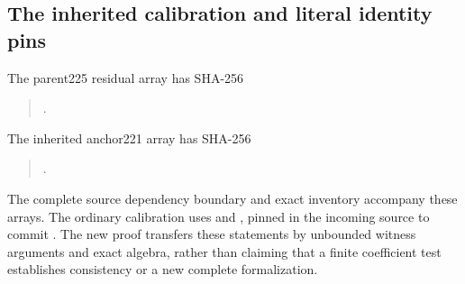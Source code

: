 \subsection{The inherited calibration and literal identity pins}
The parent225 residual array has SHA-256
\begin{quote}\small
{}.
\end{quote}
The inherited anchor221 array has SHA-256
\begin{quote}\small
{}.
\end{quote}
The complete source dependency boundary and exact inventory accompany
these arrays. The ordinary calibration uses
 and
, pinned
in the incoming source to commit
.
The new proof transfers these statements by unbounded witness arguments
and exact algebra, rather than claiming that a finite coefficient test
establishes consistency or a new complete formalization.
